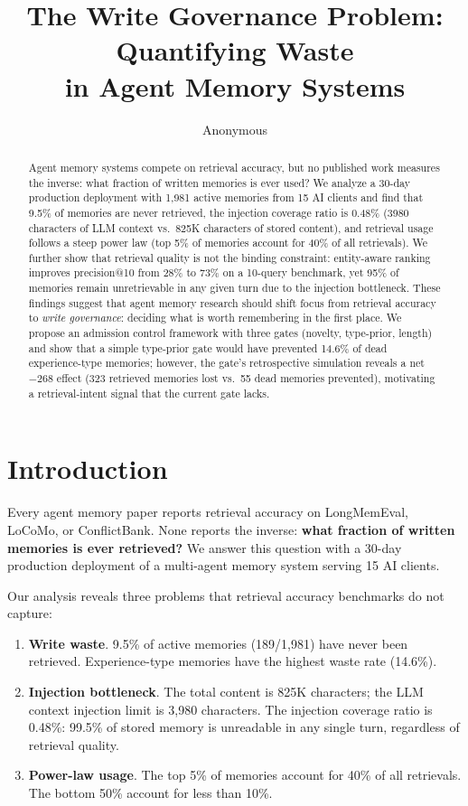 \documentclass[11pt]{article}
\title{The Write Governance Problem: Quantifying Waste\\
in Agent Memory Systems}
\author{Anonymous}
\begin{document}
\maketitle

\begin{abstract}
Agent memory systems compete on retrieval accuracy, but no published work measures the inverse: what fraction of written memories is ever used? We analyze a 30-day production deployment with 1,981 active memories from 15 AI clients and find that 9.5\% of memories are never retrieved, the injection coverage ratio is 0.48\% (3980 characters of LLM context vs.\ 825K characters of stored content), and retrieval usage follows a steep power law (top 5\% of memories account for 40\% of all retrievals). We further show that retrieval quality is not the binding constraint: entity-aware ranking improves precision@10 from 28\% to 73\% on a 10-query benchmark, yet 95\% of memories remain unretrievable in any given turn due to the injection bottleneck. These findings suggest that agent memory research should shift focus from retrieval accuracy to \emph{write governance}: deciding what is worth remembering in the first place. We propose an admission control framework with three gates (novelty, type-prior, length) and show that a simple type-prior gate would have prevented 14.6\% of dead experience-type memories; however, the gate's retrospective simulation reveals a net $-268$ effect (323 retrieved memories lost vs.\ 55 dead memories prevented), motivating a retrieval-intent signal that the current gate lacks.
\end{abstract}

\section{Introduction}

Every agent memory paper reports retrieval accuracy on LongMemEval, LoCoMo, or ConflictBank. None reports the inverse: \textbf{what fraction of written memories is ever retrieved?} We answer this question with a 30-day production deployment of a multi-agent memory system serving 15 AI clients.

Our analysis reveals three problems that retrieval accuracy benchmarks do not capture:

\begin{enumerate}
\item \textbf{Write waste}. 9.5\% of active memories (189/1,981) have never been retrieved. Experience-type memories have the highest waste rate (14.6\%).
\item \textbf{Injection bottleneck}. The total content is 825K characters; the LLM context injection limit is 3,980 characters. The injection coverage ratio is 0.48\%: 99.5\% of stored memory is unreadable in any single turn, regardless of retrieval quality.
\item \textbf{Power-law usage}. The top 5\% of memories account for 40\% of all retrievals. The bottom 50\% account for less than 10\%.
\end{enumerate}
\end{document}
